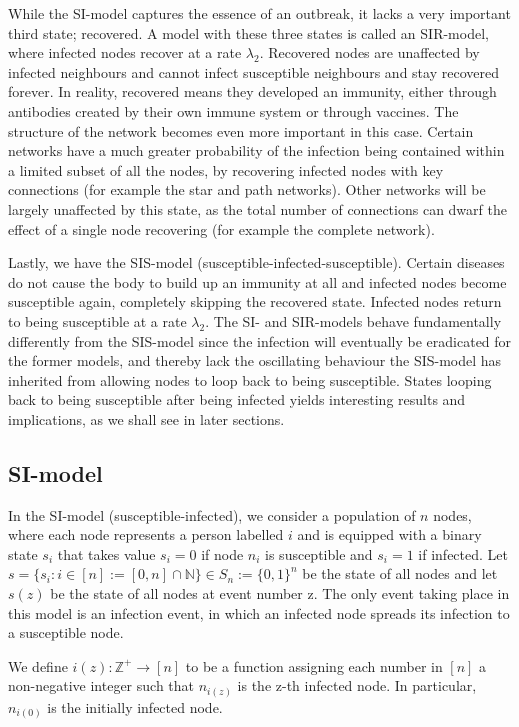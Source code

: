 \documentclass[12pt]{article} %
\numberwithin{equation}{section}
\begin{document}
While the SI-model captures the essence of an outbreak, it lacks a very important third state; recovered. A model with these three states is called an SIR-model, where infected nodes recover at a rate $\lambda_2$. Recovered nodes are unaffected by infected neighbours and cannot infect susceptible neighbours and stay recovered forever. In reality, recovered means they developed an immunity, either through antibodies created by their own immune system or through vaccines. The structure of the network becomes even more important in this case. Certain networks have a much greater probability of the infection being contained within a limited subset of all the nodes, by recovering infected nodes with key connections (for example the star and path networks). Other networks will be largely unaffected by this state, as the total number of connections can dwarf the effect of a single node recovering (for example the complete network). 

Lastly, we have the SIS-model (susceptible-infected-susceptible). Certain diseases do not cause the body to build up an immunity at all and infected nodes become susceptible again, completely skipping the recovered state. Infected nodes return to being susceptible at a rate $\lambda_2$. The SI- and SIR-models behave fundamentally differently from the SIS-model since the infection will eventually be eradicated for the former models, and thereby lack the oscillating behaviour the SIS-model has inherited from allowing nodes to loop back to being susceptible. States looping back to being susceptible after being infected yields interesting results and implications, as we shall see in later sections.


\subsection{SI-model}\label{si-model-section}
In the SI-model (susceptible-infected), we consider a population of $n$ nodes, where each node represents a person labelled $i$ and is equipped with a binary state $s_i$ that takes value $s_i = 0$ if node $n_i$ is susceptible and $s_i = 1$ if infected. Let $s = \{s_i:i\in[n] := [0,n]\cap \mathbb{N}\}\in S_n := \{0,1\}^n$ be the state of all nodes and let $s(z)$ be the state of all nodes at event number z. The only event taking place in this model is an infection event, in which an infected node spreads its infection to a susceptible node.

We define $i(z): \mathbb{Z^+} \rightarrow [n]$ to be a function assigning each number in $[n]$ a non-negative integer such that $n_{i(z)}$ is the z-th infected node. In particular, $n_{i(0)}$ is the initially infected node.
\end{document}
